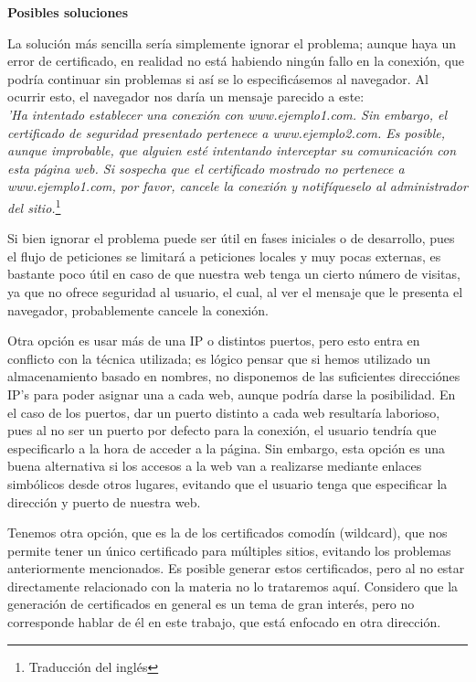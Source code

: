 \documentclass[a4paper, 10pt]{article} %
\begin{document}
\textbf{Posibles soluciones}

La solución más sencilla sería simplemente ignorar el problema; aunque haya un error de certificado, en realidad no está habiendo ningún fallo en la conexión, que podría continuar sin problemas si así se lo especificásemos al navegador. Al ocurrir esto, el navegador nos daría un mensaje parecido a este: \\
\textit{'Ha intentado establecer una conexión con www.ejemplo1.com. Sin embargo, el certificado de seguridad presentado pertenece a www.ejemplo2.com. Es posible, aunque improbable, que alguien esté intentando interceptar su comunicación con esta página web. Si sospecha que el certificado mostrado no pertenece a www.ejemplo1.com, por favor, cancele la conexión y notifíqueselo al administrador del sitio.}\footnote{Traducción del inglés} 

Si bien ignorar el problema puede ser útil en fases iniciales o de desarrollo, pues el flujo de peticiones se limitará a peticiones locales y muy pocas externas, es bastante poco útil en caso de que nuestra web tenga un cierto número de visitas, ya que no ofrece seguridad al usuario, el cual, al ver el mensaje que le presenta el navegador, probablemente cancele la conexión. 

Otra opción es usar más de una IP o distintos puertos, pero esto entra en conflicto con la técnica utilizada; es lógico pensar que si hemos utilizado un almacenamiento basado en nombres, no disponemos de las suficientes direcciónes IP's para poder asignar una a cada web, aunque podría darse la posibilidad. En el caso de los puertos, dar un puerto distinto a cada web resultaría laborioso, pues al no ser un puerto por defecto para la conexión, el usuario tendría que especificarlo a la hora de acceder a la página. Sin embargo, esta opción es una buena alternativa si los accesos a la web van a realizarse mediante enlaces simbólicos desde otros lugares, evitando que el usuario tenga que especificar la dirección y puerto de nuestra web.

Tenemos otra opción, que es la de los certificados comodín (wildcard), que nos permite tener un único certificado para múltiples sitios, evitando los problemas anteriormente mencionados. Es posible generar estos certificados, pero al no estar directamente relacionado con la materia no lo trataremos aquí. Considero que la generación de certificados en general es un tema de gran interés, pero no corresponde hablar de él en este trabajo, que está enfocado en otra dirección.
\end{document}
